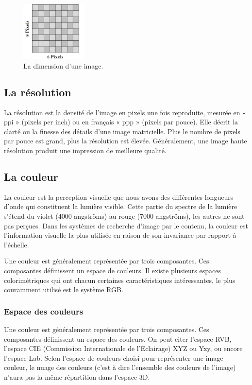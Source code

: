 \begin{figure}[H]
	\centering
	\includegraphics[width=0.3\textwidth]{Figures/dim} 
	\caption{La dimension d’une image.}
\end{figure}

\subsection{La résolution}
La résolution est la densité de l’image en pixels une fois reproduite,
mesurée en « ppi » (pixels per inch) ou en français « ppp » (pixels par pouce).
Elle décrit la clarté ou la finesse des détails d’une image matricielle. Plus le nombre de pixels par pouce est grand, plus la résolution est élevée.
Généralement, une image haute résolution produit une impression de
meilleure qualité.

\subsection{La couleur}
La couleur est la perception visuelle que nous avons des différentes
longueurs d’onde qui constituent la lumière visible. Cette partie du spectre
de la lumière s'étend du violet (4000 angströms) au rouge (7000 angströms),
les autres ne sont pas perçues.
Dans les systèmes de recherche d’image par le contenu, la couleur est
l'information visuelle la plus utilisée en raison de son invariance par rapport à l'échelle. 

Une couleur est généralement représentée par trois composantes. Ces composantes définissent un espace de couleurs. Il existe plusieurs espaces colorimétriques qui ont chacun certaines caractéristiques
intéressantes, le plus couramment utilisé est le système RGB.
\subsubsection{Espace des couleurs}
Une couleur est généralement représentée par trois composantes. Ces composantes définissent un espace des couleurs. On peut citer l'espace RVB, l'espace CIE (Commission Internationale de l'Eclairage) XYZ ou Yxy, ou encore l'espace Lab. Selon l'espace de couleurs choisi pour représenter une image couleur, le nuage des couleurs (c'est à dire l'ensemble des couleurs de l'image) n'aura pas la même répartition dans l'espace 3D.


